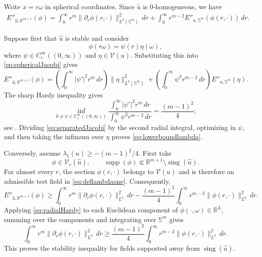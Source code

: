 \documentclass[11pt]{article}
\theoremstyle{plain}
\numberwithin{equation}{section}
\theoremstyle{definition}
\let\oldendproof\endproof
\renewenvironment{proof}[1][\proofname]{%
\oldproof[\upshape \bfseries #1]%
}{\oldendproof}
\def \R {\mathbb{R}}
\def \mc{\mathcal}
\def \mb{\mathbb}
\DeclareMathOperator{\sing}{sing}
\DeclareMathOperator{\supp}{supp}
\begin{document}
\begin{proof}
Write $x=r\omega$ in spherical coordinates. Since $\hat u$ is 0-homogeneous, we have
\begin{align}
    E''_{\hat u,\R^{m+1}}(\phi)
     =\int_0^\infty r^m
       \|\partial_r\phi(r,\cdot)\|_{L^2(\mb S^m)}^2\,dr
    +\int_0^\infty r^{m-2}
       E''_{u,\mb S^m}(\phi(r,\cdot))\,dr.        \label{eq:sphericalJacobi}
\end{align}

Suppose first that $\hat u$ is stable and consider 
\begin{equation*}
    \phi(r\omega)=\psi(r)\eta(\omega),
\end{equation*}
where $\psi\in C_c^\infty((0,\infty))$ and
$\eta\in\mc V(u)$.  Substituting this into
\eqref{eq:sphericalJacobi} gives
\begin{equation}
    \label{eq:separatedJacobi}
    E''_{\hat u,\R^{m+1}}(\phi)
    =\left(\int_0^\infty |\psi'|^2r^m\,dr\right)
       \|\eta\|_{L^2(\mb S^m)}^2
     +\left(\int_0^\infty \psi^2r^{m-2}\,dr\right)
       E''_{u,\mb S^m}(\eta).
\end{equation}
The sharp Hardy inequality gives
\begin{equation}
    \label{eq:radialHardy}
    \inf_{0\neq\psi\in C_c^\infty((0,\infty))}
    \frac{\int_0^\infty |\psi'|^2r^m\,dr}
         {\int_0^\infty \psi^2r^{m-2}\,dr}
    =\frac{(m-1)^2}{4};
\end{equation}
see \cite[Lemma 1.3]{Schoen1984}.  Dividing
\eqref{eq:separatedJacobi} by the second radial integral, optimizing in
$\psi$, and then taking the infimum over $\eta$ proves
\eqref{eq:lowerboundlambda}.

Conversely, assume
$\lambda_1(u)\geq-(m-1)^2/4$.  First take
\[
    \phi\in\mc V_c(\hat u),
    \qquad
    \supp(\phi)\Subset\R^{m+1}\setminus\sing(\hat u).
\]
For almost every $r$, the section $\phi(r,\cdot)$ belongs to $\mc V(u)$ and is therefore an admissible test field in
\eqref{eq:deflambdaone}.  Consequently,
\begin{equation*}
    E''_{\hat u,\R^{m+1}}(\phi)
    \geq
    \int_0^\infty r^m
       \|\partial_r\phi(r,\cdot)\|_{L^2}^2\,dr
    -\frac{(m-1)^2}{4}\int_0^\infty r^{m-2}
       \|\phi(r,\cdot)\|_{L^2}^2\,dr .
\end{equation*}
Applying \eqref{eq:radialHardy} to each Euclidean
component of $\phi(\cdot,\omega)\in\R^L$,
summing over the components and integrating over $\mb S^m$ gives
\[
    \int_0^\infty r^m
       \|\partial_r\phi(r,\cdot)\|_{L^2}^2\,dr
    \geq \frac{(m-1)^2}{4}\int_0^\infty r^{m-2}
       \|\phi(r,\cdot)\|_{L^2}^2\,dr.
\]
This proves the stability
inequality for fields supported away from $\sing(\hat u)$.


\end{proof}
\end{document}
